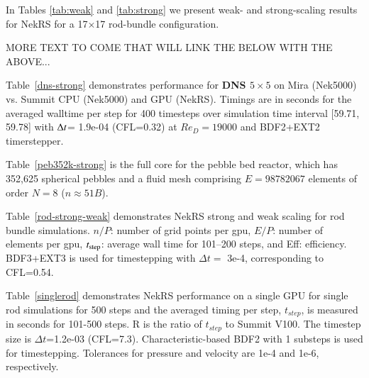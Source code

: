 
In Tables \ref{tab:weak} and \ref{tab:strong} we present weak- and strong-scaling
results for NekRS for a 17$\times$17 rod-bundle configuration.

MORE TEXT TO COME THAT WILL LINK THE BELOW WITH THE ABOVE...

Table~\ref{dns-strong} demonstrates performance for {\bf DNS $5\times5$} on Mira (Nek5000) vs. Summit CPU (Nek5000) and GPU (NekRS).
Timings are in seconds for the averaged walltime per step for 400 timesteps over simulation time interval [59.71, 59.78]
 with $\Delta t$= 1.9e-04 (CFL=0.32) at $Re_D=19000$ and BDF2+EXT2 timerstepper.  


Table~\ref{peb352k-strong} is the full core for the pebble bed reactor, which has 352,625 spherical pebbles and a fluid mesh comprising 
$E = 98782067$ elements of order $N=8$ ($n\approx 51B$). 



Table~\ref{rod-strong-weak} demonstrates NekRS strong and weak scaling for rod
bundle simulations.  $n/P$: number of grid points per gpu, $E/P$: number of
elements per gpu, $t_{\rm step}$: average wall time for 101--200 steps, and
Eff: efficiency.  BDF3+EXT3 is used for timestepping with $\Delta t=$ 3e-4,
corresponding to CFL=0.54.


Table~\ref{singlerod} demonstrates NekRS performance on a single GPU for single rod simulations for 
500 steps and the averaged timing per step, $t_{step}$, is measured in seconds for 101-500 steps. 
R is the ratio of $t_{step}$ to Summit V100.  The timestep size is $\Delta t$=1.2e-03 (CFL=7.3).
Characteristic-based BDF2 with 1 substeps is used for timestepping.
Tolerances for pressure and velocity are  1e-4 and 1e-6, respectively.



